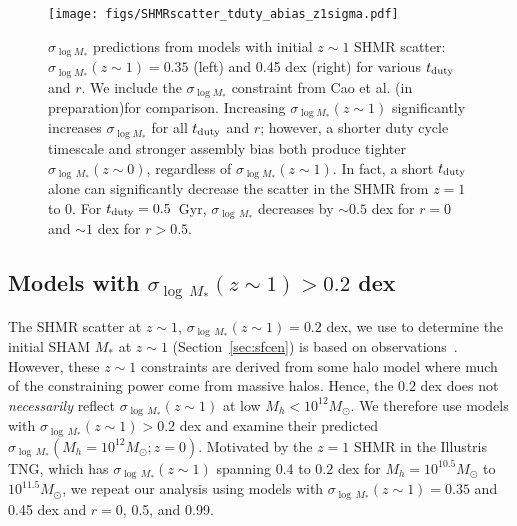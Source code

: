 \documentclass[12pt, letterpaper, preprint, tighten]{aastex62}
\newcommand{\edt}[1]{{\color{dred}{\bf} #1}}
\newcommand{\cao}{Cao et al. (in preparation)}
\newcommand{\tduty}{t_{\rm duty}}
\newcommand{\siglogm}{\sigma_{\log M_*}}
\begin{document}
\begin{figure}
\begin{center}
    \texttt{[image: figs/SHMRscatter\_tduty\_abias\_z1sigma.pdf]}
    \caption{\edt{$\siglogm$ predictions from models with initial $z\sim1$ SHMR 
    scatter: $\siglogm(z\sim1) = 0.35$ (left) and 0.45 dex (right) for various 
    $\tduty$ and $r$. We include the $\siglogm$ constraint from \cao for comparison.
    Increasing $\siglogm(z\sim1)$ significantly increases $\siglogm$ for all 
    $\tduty$ and $r$; however, a shorter duty cycle timescale and stronger assembly 
    bias both produce tighter $\sigma_{\log\,M_*}(z\sim0)$, regardless of $\siglogm(z\sim1)$.
    In fact, a short $\tduty$ alone can significantly decrease the scatter in the 
    SHMR from $z=1$ to 0. For $\tduty=0.5$~Gyr, $\sigma_{\log\,M_*}$ decreases by 
    $\sim 0.5$ dex for $r=0$ and $\sim 1$ dex for $r > 0.5$. 
    }}
\label{fig:sM_duty_abias_z1}
\end{center}
\end{figure}

\subsection{\edt{Models with  $\sigma_{\log\,M_*}(z\sim1) > 0.2$ dex}}
\edt{
The SHMR scatter at $z\sim1$, $\sigma_{\log\,M_*}(z\sim1) = 0.2$ dex, we
use to determine the initial SHAM $M_*$ at $z\sim1$ (Section~\ref{sec:sfcen})
is based on observations~\citep[\emph{e.g.}][]{leauthaud2012, tinker2013, patel2015}.
However, these $z\sim1$ constraints are derived from some halo model where
much of the constraining power come from massive halos. Hence, the $0.2$ dex
does not {\em necessarily} reflect $\sigma_{\log\,M_*}(z\sim1)$ at low
$M_h < 10^{12}M_\odot$. We therefore use models with
$\sigma_{\log\,M_*}(z\sim1) > 0.2$ dex and examine their predicted
$\sigma_{\log\,M_*}(M_h=10^{12}M_\odot; z=0)$.
Motivated by the $z=1$ SHMR in the Illustris TNG, which has
$\sigma_{\log\,M_*}(z\sim1)$ spanning $0.4$ to $0.2$ dex for $M_h = 10^{10.5}M_\odot$
to $10^{11.5}M_\odot$, we repeat our analysis using models with
$\sigma_{\log\,M_*}(z\sim1) = 0.35$ and 0.45 dex and $r=0$, 0.5,
and 0.99.
}
\end{document}
